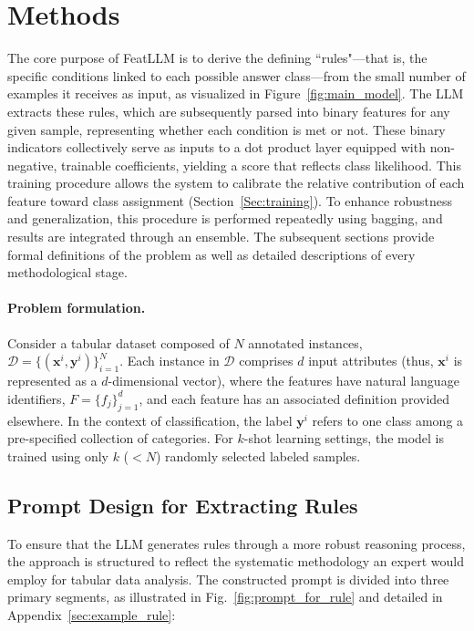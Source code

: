 \section{Methods}
The core purpose of \textsf{FeatLLM} is to derive the defining ``rules"—that is, the specific conditions linked to each possible answer class—from the small number of examples it receives as input, as visualized in Figure~\ref{fig:main_model}. The LLM extracts these rules, which are subsequently parsed into binary features for any given sample, representing whether each condition is met or not. These binary indicators collectively serve as inputs to a dot product layer equipped with non-negative, trainable coefficients, yielding a score that reflects class likelihood. This training procedure allows the system to calibrate the relative contribution of each feature toward class assignment (Section~\ref{Sec:training}). To enhance robustness and generalization, this procedure is performed repeatedly using bagging, and results are integrated through an ensemble. The subsequent sections provide formal definitions of the problem as well as detailed descriptions of every methodological stage.

\vspace*{-0.12in}
\paragraph{Problem formulation.} Consider a tabular dataset composed of $N$ annotated instances, $\mathcal{D} = \{(\mathbf{x}^i, \mathbf{y}^i)\}_{i=1}^{N}$. Each instance in $\mathcal{D}$ comprises $d$ input attributes (thus, $\mathbf{x}^i$ is represented as a $d$-dimensional vector), where the features have natural language identifiers, $F = \{f_j\}_{j=1}^{d}$, and each feature has an associated definition provided elsewhere. In the context of classification, the label $\mathbf{y}^i$ refers to one class among a pre-specified collection of categories. For $k$-shot learning settings, the model is trained using only $k$ ($<N$) randomly selected labeled samples.

\subsection{Prompt Design for Extracting Rules}
\label{Sec:prompt_design}
To ensure that the LLM generates rules through a more robust reasoning process, the approach is structured to reflect the systematic methodology an expert would employ for tabular data analysis. The constructed prompt is divided into three primary segments, as illustrated in Fig.~\ref{fig:prompt_for_rule} and detailed in Appendix~\ref{sec:example_rule}:

